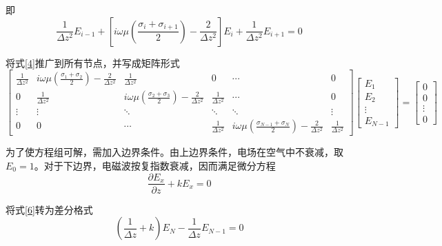 \documentclass[12pt]{ctexart}
\begin{document}
    即
    \begin{equation}
        \dfrac{1}{\Delta z^2}E_{i-1}+\left[i\omega\mu\left(\dfrac{\sigma_{i}+\sigma_{i+1}}{2}\right)-\dfrac{2}{\Delta z^2}\right]E_i+\dfrac{1}{\Delta z^2}E_{i+1}=0
        \label{4}
    \end{equation}

    将式\eqref{4}推广到所有节点，并写成矩阵形式
    \begin{equation}
        \begin{bmatrix}
            \frac{1}{\Delta z^2} & i\omega\mu\left(\frac{\sigma_{1}+\sigma_2}{2}\right)-\frac{2}{\Delta z^2} & \frac{1}{\Delta z^2} & 0 & \cdots & 0 \\
            0 & \frac{1}{\Delta z^2} & i\omega\mu\left(\frac{\sigma_{2}+\sigma_3}{2}\right)-\frac{2}{\Delta z^2} & \frac{1}{\Delta z^2} & \cdots & 0 \\
            \vdots & \vdots & \ddots & \ddots & \ddots & \vdots \\
            0 & 0 & \cdots & \frac{1}{\Delta z^2} & i\omega\mu\left(\frac{\sigma_{N-1}+\sigma_N}{2}\right)-\frac{2}{\Delta z^2} & \frac{1}{\Delta z^2}
        \end{bmatrix}
        \begin{bmatrix}
            E_1 \\
            E_2 \\
            \vdots \\
            E_{N-1}
        \end{bmatrix}=
        \begin{bmatrix}
            0 \\
            0 \\
            \vdots \\
            0
        \end{bmatrix}
        \label{5}
    \end{equation}

    为了使方程组可解，需加入边界条件。由上边界条件，电场在空气中不衰减，取$E_0=1$。对于下边界，电磁波按复指数衰减，因而满足微分方程
    \begin{equation}
        \dfrac{\partial E_x}{\partial z}+kE_x=0\label{6}
    \end{equation}

    将式\eqref{6}转为差分格式
    \begin{equation}
        \left(\dfrac{1}{\Delta z}+k\right)E_N-\dfrac{1}{\Delta z}E_{N-1}=0\label{7}
    \end{equation}
\end{document}
